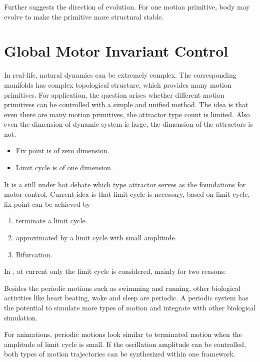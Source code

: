 Further \moit suggests the direction of evolution.
For one motion primitive, body may evolve to make the primitive more structural stable.






\section{Global Motor Invariant Control}
\label{sec:cpgcontrol}

In real-life,  natural dynamics can be extremely complex. 
The corresponding manifolds has complex topological structure, which provides many motion primitives.
For \cms application, the question arises whether different motion primitives can be controlled with a simple and unified method.
The idea is that even there are many motion primitives, the attractor type count is limited. 
Also even the dimension of dynamic system is large, the dimension of the attractors is not. 
\begin{itemize}
\item Fix point is of zero dimension. 
\item Limit cycle is of one dimension.
\end{itemize}



It is a still under hot debate which type attractor serves as the foundations for motor control\citep{Degallier2010}.
Current idea is that limit cycle is necessary, based on limit cycle, fix point can be achieved by
\begin{enumerate} 
\item terminate a limit cycle. 
\item approximated by a limit cycle with small amplitude.
\item Bifurcation. 
\end{enumerate}


In \moit, at current only the limit cycle is considered, mainly for two reasons: 
\begin{itemize}
Besides the periodic motions such as swimming and running, other biological activities like heart beating, wake and sleep  are periodic.
A periodic system has the potential to simulate more types of motion and integrate with other biological simulation.

For animations, periodic motions look similar to terminated motion when the amplitude of limit cycle is small. 
If the oscillation amplitude can be controlled, both types of motion trajectories can be synthesized within one framework.
\end{itemize}

